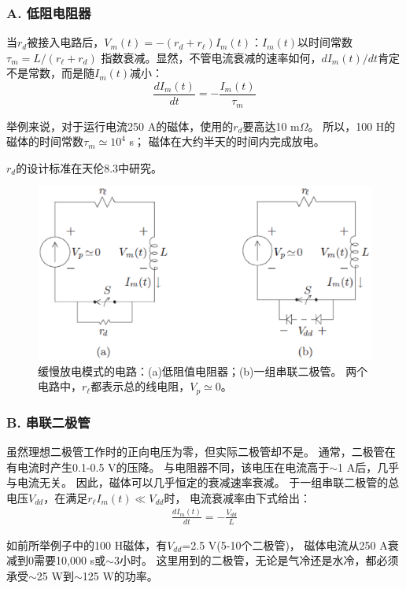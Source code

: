 \subsubsection*{A. 低阻电阻器}
当$r_d$被接入电路后，$V_m(t)=-(r_d+r_\ell)I_m(t)$：$I_m(t)$以时间常数$\tau_m=L/(r_\ell+r_d)$
指数衰减。显然，不管电流衰减的速率如何，$dI_m(t)/dt$肯定不是常数，而是随$I_m(t)$减小：
\begin{equation}%
\frac{dI_m(t)}{dt}=-\frac{I_m(t)}{\tau_m}
\end{equation}

举例来说，对于运行电流250 A的磁体，使用的$r_d$要高达10 m$\Omega$。
所以，100 H的磁体的时间常数$\tau_m\simeq 10^4$ s；
磁体在大约半天的时间内完成放电。

$r_d$的设计标准在天伦8.3中研究。

\begin{figure}
	\centering
	\includegraphics[scale=0.6]{chpt8/figs/fig8.23.eps}
	\caption{缓慢放电模式的电路：(a)低阻值电阻器；(b)一组串联二极管。
		两个电路中，$r_\ell$都表示总的线电阻，$V_p\simeq 0$。}
\end{figure}

\subsubsection*{B. 串联二极管}
虽然理想二极管工作时的正向电压为零，但实际二极管却不是。
通常，二极管在有电流时产生0.1-0.5 V的压降。
 与电阻器不同，该电压在电流高于$\sim$1 A后，几乎与电流无关。
  因此，磁体可以几乎恒定的衰减速率衰减。
  于一组串联二极管的总电压$V_{dd}$，在满足$r_\ell I_m(t)\ll V_{dd}$时，
  电流衰减率由下式给出：
\begin{align*}%
\frac{dI_m(t)}{dt}=-\frac{V_{dd}}{L} \tag{8.76b}
\end{align*}

如前所举例子中的100 H磁体，有$V_{dd}$=2.5 V(5-10个二极管)，
磁体电流从250 A衰减到0需要10,000 s或$\sim$3小时。
这里用到的二极管，无论是气冷还是水冷，都必须承受$\sim$25 W到$\sim$125 W的功率。


